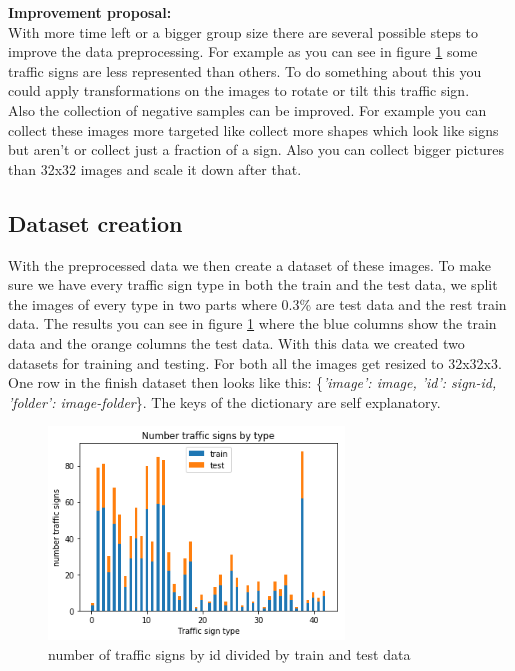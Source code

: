 \documentclass[12pt,a4paper,bibliography=totocnumbered,listof=totocnumbered]{scrartcl}
\begin{document}
\textbf{Improvement proposal:}\\
With more time left or a bigger group size there are several possible steps to improve the data preprocessing. For example as you can see in figure \ref{fig:data_hist} some traffic signs are less represented than others. To do something about this you could apply transformations on the images to rotate or tilt this traffic sign.\\
Also the collection of negative samples can be improved. For example you can collect these images more targeted like collect more shapes which look like signs but aren't or collect just a fraction of a sign. Also you can collect bigger pictures than 32x32 images and scale it down after that.

\subsection{Dataset creation}

With the preprocessed data we then create a dataset of these images. To make sure we have every traffic sign type in both the train and the test data, we split the images of every type in two parts where 0.3\% are test data and the rest train data. The results you can see in figure \ref{fig:data_hist} where the blue columns show the train data and the orange columns the test data. With this data we created two datasets for training and testing. For both all the images get resized to 32x32x3. One row in the finish dataset then looks like this: \{\textit{'image': image, 'id': sign-id, 'folder': image-folder}\}. The keys of the dictionary are self explanatory.

\begin{figure}[htbp] 
  \centering
     \includegraphics[width=0.7\textwidth]{data_hist}
  \caption{number of traffic signs by id divided by train and test data}
  \label{fig:data_hist}
\end{figure}
\end{document}
